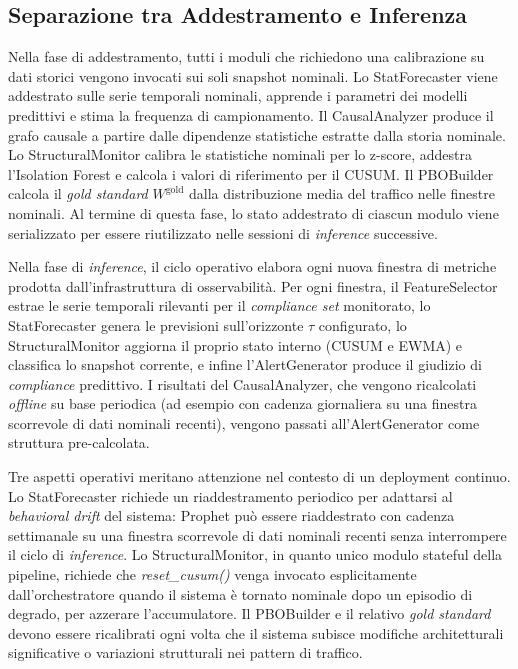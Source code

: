 \subsection{Separazione tra Addestramento e Inferenza}
\label{subsec:training_inference}

Nella fase di addestramento, tutti i moduli che richiedono una calibrazione su dati storici
vengono invocati sui soli snapshot nominali. Lo StatForecaster viene addestrato sulle
serie temporali nominali, apprende i parametri dei modelli predittivi e stima la frequenza
di campionamento. Il CausalAnalyzer produce il grafo causale a partire dalle dipendenze
statistiche estratte dalla storia nominale. Lo StructuralMonitor calibra le statistiche
nominali per lo z-score, addestra l'Isolation Forest e calcola i valori di riferimento per il
\gls{CUSUM}. Il PBOBuilder calcola il \textit{gold standard} $W^{\text{gold}}$ dalla
distribuzione media del traffico nelle finestre nominali. Al termine di questa fase, lo stato
addestrato di ciascun modulo viene serializzato per essere riutilizzato nelle sessioni di
\textit{inference} successive.

Nella fase di \textit{inference}, il ciclo operativo elabora ogni nuova finestra di metriche
prodotta dall'infrastruttura di osservabilità. Per ogni finestra, il FeatureSelector
estrae le serie temporali rilevanti per il \textit{compliance set} monitorato, lo
StatForecaster genera le previsioni sull'orizzonte $\tau$ configurato, lo
StructuralMonitor aggiorna il proprio stato interno (\gls{CUSUM} e \gls{EWMA}) e
classifica lo snapshot corrente, e infine l'AlertGenerator produce il giudizio di
\textit{compliance} predittivo. I risultati del CausalAnalyzer, che vengono ricalcolati
\textit{offline} su base periodica (ad esempio con cadenza giornaliera su una finestra scorrevole
di dati nominali recenti), vengono passati all'AlertGenerator come struttura pre-calcolata.

Tre aspetti operativi meritano attenzione nel contesto di un deployment continuo. Lo
StatForecaster richiede un riaddestramento periodico per adattarsi al \textit{behavioral
drift} del sistema: Prophet può essere riaddestrato con cadenza settimanale su una finestra
scorrevole di dati nominali recenti senza interrompere il ciclo di \textit{inference}. 
Lo StructuralMonitor, in quanto unico modulo stateful della pipeline, richiede che
\textit{reset\_cusum()} venga invocato esplicitamente dall'orchestratore quando
il sistema è tornato nominale dopo un episodio di degrado, per azzerare l'accumulatore. Il
PBOBuilder e il relativo \textit{gold standard} devono essere ricalibrati ogni volta
che il sistema subisce modifiche architetturali significative o variazioni strutturali nei
pattern di traffico.

